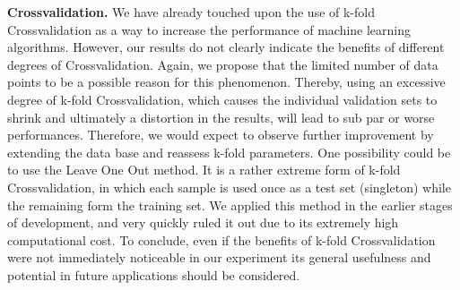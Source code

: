 \textbf{Crossvalidation.} We have already touched upon the use of k-fold Crossvalidation as a way to increase the performance of machine learning algorithms.
However, our results do not clearly indicate the benefits of different degrees of Crossvalidation. Again, we propose that the limited number of data points to be a possible reason for this phenomenon. Thereby, using an excessive degree of k-fold Crossvalidation, which causes the individual validation sets to shrink and ultimately a distortion in the results, will lead to sub par or worse performances. Therefore, we would expect to observe further improvement by extending the data base and reassess k-fold parameters. One possibility could be to use the Leave One Out method. It is a rather extreme form of k-fold Crossvalidation, in which each sample is used once as a test set (singleton) while the remaining form the training set. We applied this method in the earlier stages of development, and very quickly ruled it out due to its extremely high computational cost. To conclude, even if the benefits of k-fold Crossvalidation were not immediately noticeable in our experiment its general usefulness and potential in future applications should be considered.\\[10pt]
